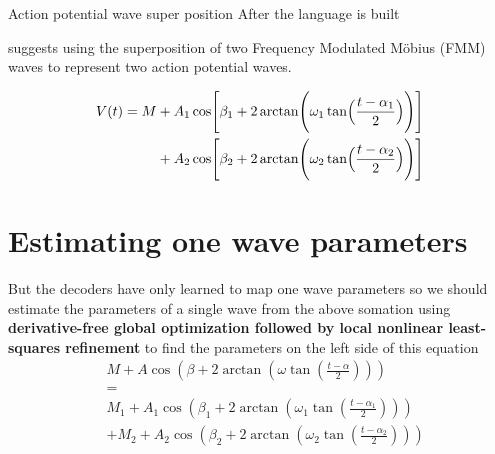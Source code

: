 \begin{frame}[allowframebreaks]{Action potential wave super position}
    After the language is built
    
    \cite{rueda-2021-a-novel-wave-decomposition-for-oscillatory-signals} suggests using the superposition of two Frequency Modulated M\"obius (FMM) waves to represent two action potential waves.
    
    \begin{equation}
        \begin{aligned}
            V(t)
            =
            M
            &+
            A_1
            \cos
            \Biggl[
                \beta_1
                +
                2
                \arctan
                \Biggl(
                \omega_1
                \tan
                \Bigl(
                \frac{t-\alpha_1}{2}
                \Bigr)
                \Biggr)
                \Biggr]
            \\
            &+
            A_2
            \cos
            \Biggl[
                \beta_2
                +
                2
                \arctan
                \Biggl(
                \omega_2
                \tan
                \Bigl(
                \frac{t-\alpha_2}{2}
                \Bigr)
                \Biggr)
                \Biggr]
        \end{aligned}
    \end{equation}
    
    
    \section{Estimating one wave parameters}
        But the decoders have only learned to map one wave parameters so we should estimate the parameters of a single wave from the above somation using \textbf{derivative-free global optimization followed by local nonlinear least-squares refinement} to find the parameters on the left side of this equation
        \[
            \begin{aligned}
                &M
                +
                A\cos\left(
                         \beta
                         +
                         2\arctan\left(
                                     \omega\tan\left(\frac{t-\alpha}{2}\right)
                    \right)
                \right)
                \\
                &=
                \\
                &M_1
                +
                A_1\cos\left(
                           \beta_1
                    +
                    2\arctan\left(
                                \omega_1\tan\left(\frac{t-\alpha_1}{2}\right)
                    \right)
                \right)
                \\
                &+
                M_2
                +
                A_2\cos\left(
                           \beta_2
                    +
                    2\arctan\left(
                                \omega_2\tan\left(\frac{t-\alpha_2}{2}\right)
                    \right)
                \right)
            \end{aligned}
        \]
\end{frame}